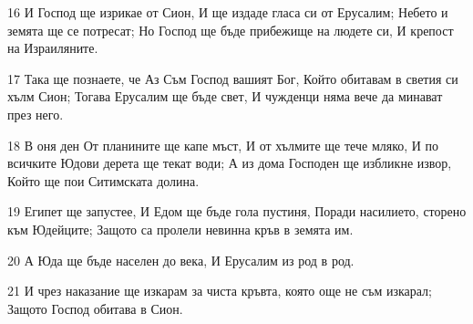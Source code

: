 \par 16 И Господ ще изрикае от Сион, И ще издаде гласа си от Ерусалим; Небето и земята ще се потресат; Но Господ ще бъде прибежище на людете си, И крепост на Израиляните.
\par 17 Така ще познаете, че Аз Съм Господ вашият Бог, Който обитавам в светия си хълм Сион; Тогава Ерусалим ще бъде свет, И чужденци няма вече да минават през него.
\par 18 В оня ден От планините ще капе мъст, И от хълмите ще тече мляко, И по всичките Юдови дерета ще текат води; А из дома Господен ще избликне извор, Който ще пои Ситимската долина.
\par 19 Египет ще запустее, И Едом ще бъде гола пустиня, Поради насилието, сторено към Юдейците; Защото са пролели невинна кръв в земята им.
\par 20 А Юда ще бъде населен до века, И Ерусалим из род в род.
\par 21 И чрез наказание ще изкарам за чиста кръвта, която още не съм изкарал; Защото Господ обитава в Сион.

